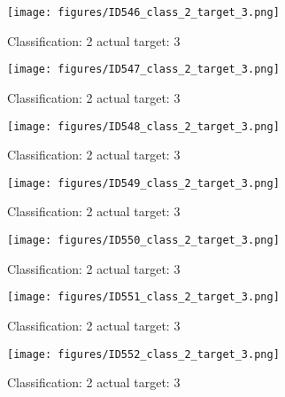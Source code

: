 \begin{figure}[h!]
\begin{center}
\texttt{[image: figures/ID546\_class\_2\_target\_3.png]}
\end{center}
\caption{ Classification: 2 actual target: 3}
\label{fig:ID546_class_2_target_3}
\end{figure}
\begin{figure}[h!]
\begin{center}
\texttt{[image: figures/ID547\_class\_2\_target\_3.png]}
\end{center}
\caption{ Classification: 2 actual target: 3}
\label{fig:ID547_class_2_target_3}
\end{figure}
\begin{figure}[h!]
\begin{center}
\texttt{[image: figures/ID548\_class\_2\_target\_3.png]}
\end{center}
\caption{ Classification: 2 actual target: 3}
\label{fig:ID548_class_2_target_3}
\end{figure}
\begin{figure}[h!]
\begin{center}
\texttt{[image: figures/ID549\_class\_2\_target\_3.png]}
\end{center}
\caption{ Classification: 2 actual target: 3}
\label{fig:ID549_class_2_target_3}
\end{figure}
\begin{figure}[h!]
\begin{center}
\texttt{[image: figures/ID550\_class\_2\_target\_3.png]}
\end{center}
\caption{ Classification: 2 actual target: 3}
\label{fig:ID550_class_2_target_3}
\end{figure}
\begin{figure}[h!]
\begin{center}
\texttt{[image: figures/ID551\_class\_2\_target\_3.png]}
\end{center}
\caption{ Classification: 2 actual target: 3}
\label{fig:ID551_class_2_target_3}
\end{figure}
\begin{figure}[h!]
\begin{center}
\texttt{[image: figures/ID552\_class\_2\_target\_3.png]}
\end{center}
\caption{ Classification: 2 actual target: 3}
\label{fig:ID552_class_2_target_3}
\end{figure}

